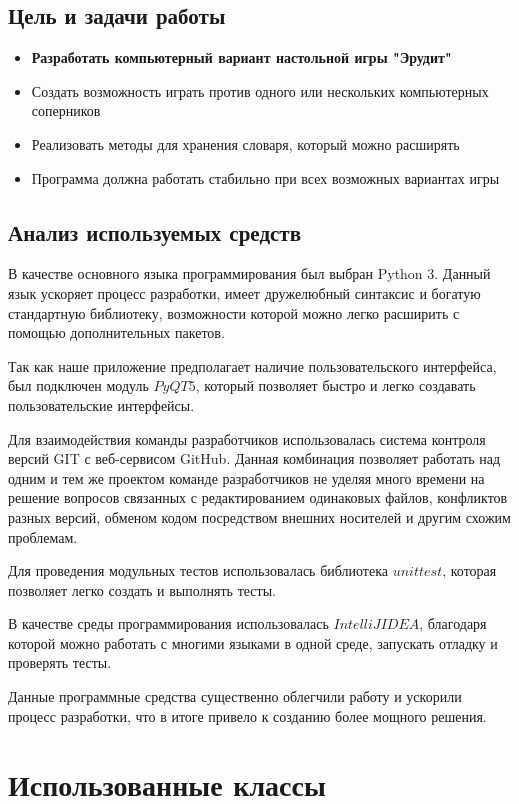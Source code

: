 \documentclass[a4paper,14pt]{article}
\begin{document}
	\subsection{Цель и задачи работы}
	\begin{itemize}
		\item \textbf{Разработать компьютерный вариант настольной игры "Эрудит"}
		\item Создать возможность играть против одного или нескольких компьютерных соперников
		\item Реализовать методы для хранения словаря, который можно расширять
		\item Программа должна работать стабильно при всех возможных вариантах игры
	\end{itemize}

	\subsection{Анализ используемых средств}
	В качестве основного языка программирования был выбран Python 3. Данный язык ускоряет процесс разработки, имеет дружелюбный синтаксис и богатую стандартную библиотеку, возможности которой можно легко расширить с помощью дополнительных пакетов.
	
	Так как наше приложение предполагает наличие пользовательского интерфейса, был подключен модуль $PyQT5$, который позволяет быстро и легко создавать пользовательские интерфейсы.
	
	Для взаимодействия команды разработчиков использовалась система контроля версий GIT с веб-сервисом GitHub. Данная комбинация позволяет работать над одним и тем же проектом команде разработчиков не уделяя много времени на решение вопросов связанных с редактированием одинаковых файлов, конфликтов разных версий, обменом кодом посредством внешних носителей и другим схожим проблемам.
	
	Для проведения модульных тестов использовалась библиотека $unittest$, которая позволяет легко создать и выполнять тесты.
	
	В качестве среды программирования использовалась $IntelliJ IDEA$, благодаря которой можно работать с многими языками в одной среде, запускать отладку и проверять тесты.
	
	Данные программные средства существенно облегчили работу  и ускорили процесс разработки, что в итоге привело к созданию более мощного решения.
\section{Использованные классы}
\end{document}
